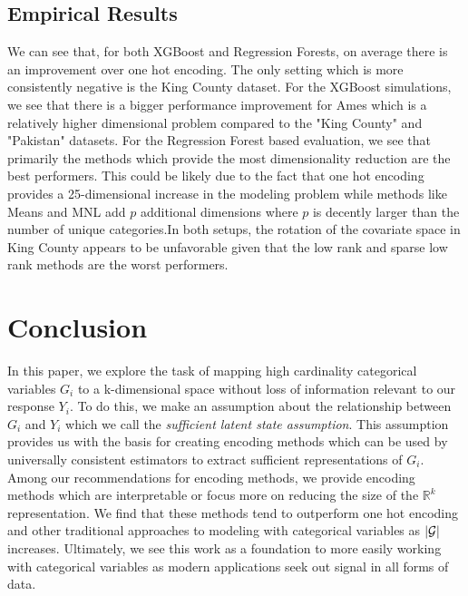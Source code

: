 \documentclass{article}
\theoremstyle{plain}
\theoremstyle{definition}
\theoremstyle{remark}
\begin{document}
\subsection{Empirical Results}


We can see that, for both XGBoost and Regression Forests, on average there is an improvement over one hot encoding. The only setting which is more consistently negative is the King County dataset. For the XGBoost simulations, we see that there is a bigger performance improvement for Ames which is a relatively higher dimensional problem compared to the "King County" and "Pakistan" datasets. For the Regression Forest based evaluation, we see that primarily the methods which provide the most dimensionality reduction are the best performers. This could be likely due to the fact that one hot encoding provides a 25-dimensional increase in the modeling problem while methods like Means and MNL add $p$ additional dimensions where $p$ is decently larger than the number of unique categories.In both setups, the rotation of the covariate space in King County appears to be unfavorable given that the low rank and sparse low rank methods are the worst performers.








\section{Conclusion}
In this paper, we explore the task of mapping high cardinality categorical variables $G_i$ to a k-dimensional space without loss of information relevant to our response $Y_i$. To do this, we make an assumption about the relationship between $G_i$ and $Y_i$ which we call the \textit{sufficient latent state assumption}. This assumption provides us with the basis for creating encoding methods which can be used by universally consistent estimators to extract sufficient representations of $G_i$. Among our recommendations for encoding methods, we provide encoding methods which are interpretable or focus more on reducing the size of the  $\mathbb{R}^k$ representation. We find that these methods tend to outperform one hot encoding and other traditional approaches to modeling with categorical variables as $|\mathcal{G}|$ increases. Ultimately, we see this work as a foundation to more easily working with categorical variables as modern applications seek out signal in all forms of data.
\end{document}
